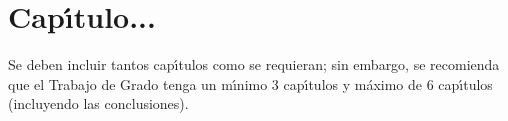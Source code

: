 \chapter{Cap\'{\i}tulo...}
Se deben incluir tantos cap\'{\i}tulos como se requieran; sin embargo, se recomienda que el Trabajo de Grado tenga un m\'{\i}nimo 3 cap\'{\i}tulos y m\'{a}ximo de 6 cap\'{\i}tulos (incluyendo las conclusiones).\\ 